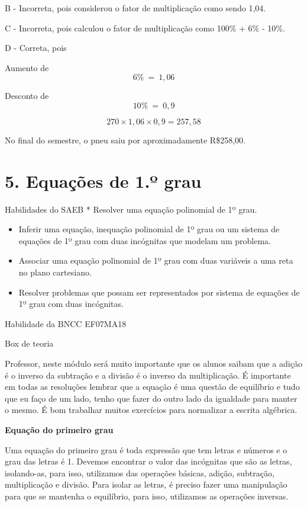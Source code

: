 B - Incorreta, pois considerou o fator de multiplicação como sendo 1,04.

C - Incorreta, pois calculou o fator de multiplicação como 100\% + 6\% -
10\%.

D - Correta, pois

Aumento de \[6\%\  = \ 1,06\]

Desconto de \[10\%\  = \ 0,9\]

\[270 \times 1,06 \times 0,9 = 257,58\]

No final do semestre, o pneu saiu por aproximadamente R\$258,00.

\hypertarget{equauxe7uxf5es-de-1.uxba-grau}{%
\section{5. Equações de 1.º grau}\label{equauxe7uxf5es-de-1.uxba-grau}}

Habilidades do SAEB * Resolver uma equação polinomial de 1º grau.

\begin{itemize}
\item
  Inferir uma equação, inequação polinomial de 1º grau ou um sistema de
  equações de 1º grau com duas incógnitas que modelam um problema.
\item
  Associar uma equação polinomial de 1º grau com duas variáveis a uma
  reta no plano cartesiano.
\item
  Resolver problemas que possam ser representados por sistema de
  equações de 1º grau com duas incógnitas.
\end{itemize}

Habilidade da BNCC EF07MA18

Box de teoria

Professor, neste módulo será muito importante que os alunos saibam que a
adição é o inverso da subtração e a divisão é o inverso da
multiplicação. É importante em todas as resoluções lembrar que a equação
é uma questão de equilíbrio e tudo que eu faço de um lado, tenho que
fazer do outro lado da igualdade para manter o mesmo. É bom trabalhar
muitos exercícios para normalizar a escrita algébrica.

\textbf{Equação do primeiro grau}

Uma equação do primeiro grau é toda expressão que tem letras e números e
o grau das letras é 1. Devemos encontrar o valor das incógnitas que são
as letras, isolando-as, para isso, utilizamos das operações básicas,
adição, subtração, multiplicação e divisão. Para isolar as letras, é
preciso fazer uma manipulação para que se mantenha o equilíbrio, para
isso, utilizamos as operações inversas.

